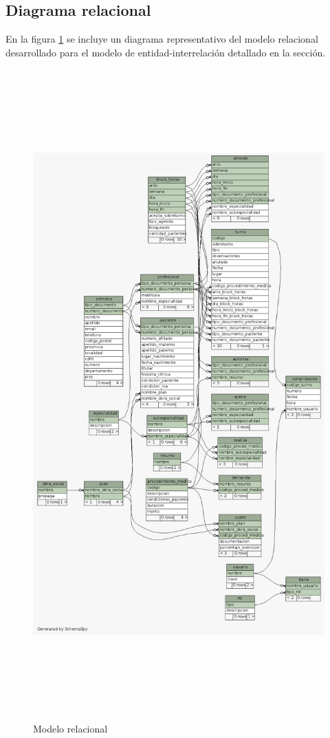 \documentclass[a4paper,11pt]{article}
\begin{document}
\subsection{Diagrama relacional}

 En la figura \ref{fig:relacional} se incluye un diagrama representativo del
 modelo relacional desarrollado para el modelo de entidad-interrelación
 detallado en la sección.

\begin{figure}[h!t]
  \centering
  \includegraphics[width=15cm,height=25cm,angle=0]{build/images/relacional.png}
  \caption{Modelo relacional}
  \label{fig:relacional}
\end{figure}
\end{document}
